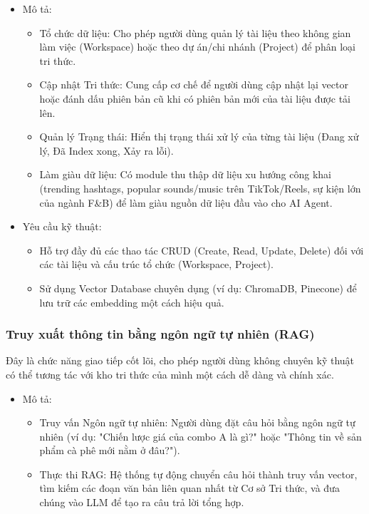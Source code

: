 \begin{itemize}
\item
  Mô tả:

  \begin{itemize}
  \item
    Tổ chức dữ liệu: Cho phép người dùng quản lý tài liệu theo không
    gian làm việc (Workspace) hoặc theo dự án/chi nhánh (Project) để
    phân loại tri thức.
  \item
    Cập nhật Tri thức: Cung cấp cơ chế để người dùng cập nhật lại vector
    hoặc đánh dấu phiên bản cũ khi có phiên bản mới của tài liệu được
    tải lên.
  \item
    Quản lý Trạng thái: Hiển thị trạng thái xử lý của từng tài liệu
    (Đang xử lý, Đã Index xong, Xảy ra lỗi).
  \item
    Làm giàu dữ liệu: Có module thu thập dữ liệu xu hướng công khai
    (trending hashtags, popular sounds/music trên TikTok/Reels, sự kiện
    lớn của ngành F\&B) để làm giàu nguồn dữ liệu đầu vào cho AI Agent.
  \end{itemize}
\item
  Yêu cầu kỹ thuật:

  \begin{itemize}
  \item
    Hỗ trợ đầy đủ các thao tác CRUD (Create, Read, Update, Delete) đối
    với các tài liệu và cấu trúc tổ chức (Workspace, Project).
  \item
    Sử dụng Vector Database chuyên dụng (ví dụ: ChromaDB, Pinecone) để
    lưu trữ các embedding một cách hiệu quả.
  \end{itemize}
\end{itemize}

\subsubsection{Truy xuất thông tin bằng ngôn ngữ tự nhiên
(RAG)}\label{truy-xuux1ea5t-thuxf4ng-tin-bux1eb1ng-nguxf4n-ngux1eef-tux1ef1-nhiuxean-rag}

Đây là chức năng giao tiếp cốt lõi, cho phép người dùng không chuyên kỹ
thuật có thể tương tác với kho tri thức của mình một cách dễ dàng và
chính xác.

\begin{itemize}
\item
  Mô tả:

  \begin{itemize}
  \item
    Truy vấn Ngôn ngữ tự nhiên: Người dùng đặt câu hỏi bằng ngôn ngữ tự
    nhiên (ví dụ: "Chiến lược giá của combo A là gì?" hoặc "Thông tin về
    sản phẩm cà phê mới nằm ở đâu?").
  \item
    Thực thi RAG: Hệ thống tự động chuyển câu hỏi thành truy vấn vector,
    tìm kiếm các đoạn văn bản liên quan nhất từ Cơ sở Tri thức, và đưa
    chúng vào LLM để tạo ra câu trả lời tổng hợp.
  \end{itemize}
\end{itemize}

